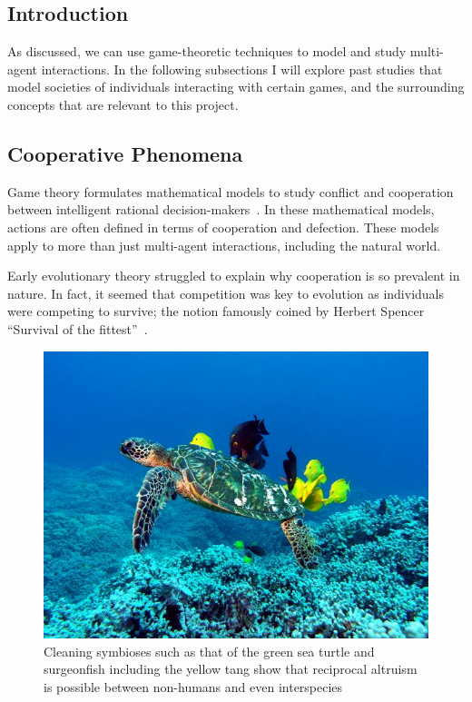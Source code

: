 \documentclass[]{final_report}
\begin{document}
\subsection{Introduction}
As discussed, we can use game-theoretic techniques to model and study multi-agent interactions. In the following subsections I will explore past studies that model societies of individuals interacting with certain games, and the surrounding concepts that are relevant to this project.

\subsection{Cooperative Phenomena}
Game theory formulates mathematical models to study conflict and cooperation between intelligent rational decision-makers~\cite{myerson2013game}. In these mathematical models, actions are often defined in terms of cooperation and defection. These models apply to more than just multi-agent interactions, including the natural world.\par 
Early evolutionary theory struggled to explain why cooperation is so prevalent in nature. In fact, it seemed that competition was key to evolution as individuals were competing to survive; the notion famously coined by Herbert Spencer ``Survival of the fittest''~\cite{spencer1864principles}.\par
\begin{figure}
\vspace{-20pt}
\begin{framed}
	\center
	\includegraphics[width=\textwidth]{Green_Sea_Turtle_Cleaning_Station.jpg}
	\caption{Cleaning symbioses such as that of the green sea turtle and surgeonfish including the yellow tang show that reciprocal altruism is possible between non-humans and even interspecies~\cite{turtle}}
	\label{fig:cleaning}
\end{framed}
\vspace{-40pt}
\end{figure}
\end{document}
